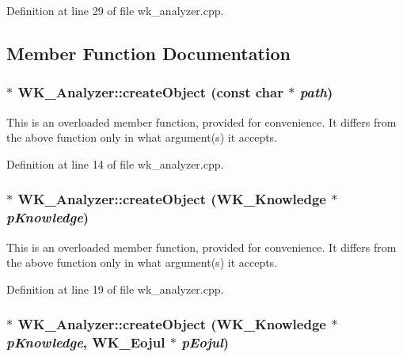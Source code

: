 Definition at line 29 of file wk\_\-analyzer.cpp.

\subsection{Member Function Documentation}
\hypertarget{classWK__Analyzer_d9f2c2827683633f99176501680699ae}{
\subsubsection[{createObject}]{ $\ast$ WK\_\-Analyzer::createObject (const char $\ast$ {\em path})}}
\label{classWK__Analyzer_d9f2c2827683633f99176501680699ae}


This is an overloaded member function, provided for convenience. It differs from the above function only in what argument(s) it accepts. 

Definition at line 14 of file wk\_\-analyzer.cpp.\hypertarget{classWK__Analyzer_19eb8ec6afe38fae9f713e97a7b2b1a3}{
\subsubsection[{createObject}]{ $\ast$ WK\_\-Analyzer::createObject ({\bf WK\_\-Knowledge} $\ast$ {\em pKnowledge})}}
\label{classWK__Analyzer_19eb8ec6afe38fae9f713e97a7b2b1a3}


This is an overloaded member function, provided for convenience. It differs from the above function only in what argument(s) it accepts. 

Definition at line 19 of file wk\_\-analyzer.cpp.\hypertarget{classWK__Analyzer_3c9feae7eb43ef3363dcc6a6166c5dc3}{
\subsubsection[{createObject}]{ $\ast$ WK\_\-Analyzer::createObject ({\bf WK\_\-Knowledge} $\ast$ {\em pKnowledge}, \/  {\bf WK\_\-Eojul} $\ast$ {\em pEojul})}}
\label{classWK__Analyzer_3c9feae7eb43ef3363dcc6a6166c5dc3}


